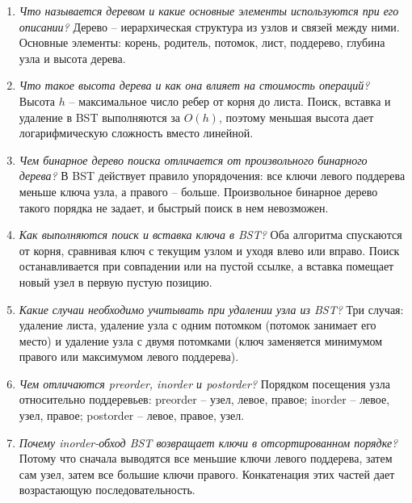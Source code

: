 \begin{enumerate}
	\item \textit{Что называется деревом и какие основные элементы используются при его описании?}\newline
	Дерево -- иерархическая структура из узлов и связей между ними. 
	Основные элементы: корень, родитель, потомок, лист, поддерево, глубина узла и высота дерева.
	
	\item \textit{Что такое высота дерева и как она влияет на стоимость операций?}\newline
	Высота $h$ -- максимальное число ребер от корня до листа. 
	Поиск, вставка и удаление в BST выполняются за $O(h)$, поэтому меньшая высота дает логарифмическую сложность вместо линейной.
	
	\item \textit{Чем бинарное дерево поиска отличается от произвольного бинарного дерева?}\newline
	В BST действует правило упорядочения: все ключи левого поддерева меньше ключа узла, а правого -- больше. 
	Произвольное бинарное дерево такого порядка не задает, и быстрый поиск в нем невозможен.
	
	\item \textit{Как выполняются поиск и вставка ключа в BST?}\newline
	Оба алгоритма спускаются от корня, сравнивая ключ с текущим узлом и уходя влево или вправо. 
	Поиск останавливается при совпадении или на пустой ссылке, а вставка помещает новый узел в первую пустую позицию.
	
	\item \textit{Какие случаи необходимо учитывать при удалении узла из BST?}\newline
	Три случая: удаление листа, удаление узла с одним потомком (потомок занимает его место) и удаление узла с двумя потомками (ключ заменяется минимумом правого или максимумом левого поддерева).
	
	\item \textit{Чем отличаются preorder, inorder и postorder?}\newline
	Порядком посещения узла относительно поддеревьев: 
		preorder -- узел, левое, правое; 
		inorder -- левое, узел, правое; 
		postorder -- левое, правое, узел.
	
	\item \textit{Почему inorder-обход BST возвращает ключи в отсортированном порядке?}\newline
	Потому что сначала выводятся все меньшие ключи левого поддерева, затем сам узел, затем все большие ключи правого. 
	Конкатенация этих частей дает возрастающую последовательность.
	

\end{enumerate}
